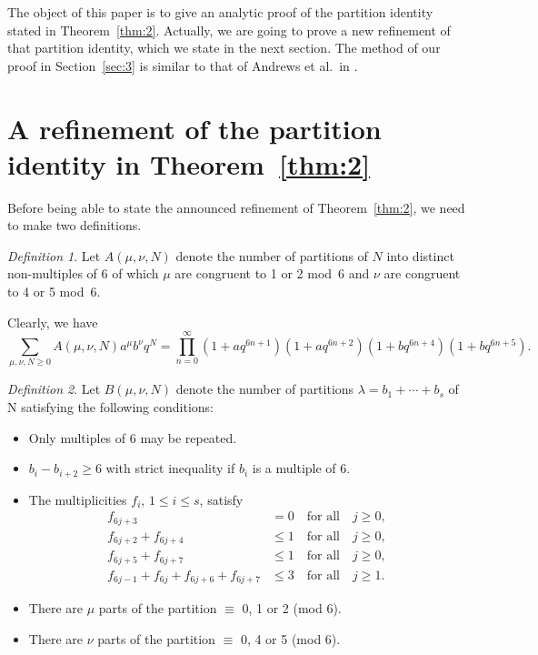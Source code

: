 \documentclass[12pt,twoside]{amsart}
\theoremstyle{remark}
\newtheorem{Definition}{Definition}
\numberwithin{equation}{section}
\begin{document}
     The object of this paper is to give an analytic proof of the
partition identity stated in
Theorem~\ref{thm:2}. Actually, we are going to prove a new refinement
of that partition identity, which we state in the next section.
The method of our proof in Section~\ref{sec:3}
is similar to that of Andrews et al.\ in \cite{R3}.

\section{A refinement of the partition identity in
Theorem~\ref{thm:2}} \label{sec:2}

Before being able to state the announced refinement of
Theorem~\ref{thm:2}, we need to make two definitions.

\begin{Definition}\label{def:1} Let $A(\mu,\nu,N)$ denote the number of
partitions of $N$ into distinct non-multiples of 6 of which $ \mu $
are congruent to 1 or 2 mod~6
and $\nu $  are congruent to 4 or 5 mod~6.
\end{Definition}

Clearly, we have
\begin{equation} \label{eq:GF}
\sum_{\mu,\nu,N \geq 0}A(\mu,\nu,N)a^\mu b^\nu q^N
 =
\prod^\infty_{n=0}(1+aq^{6n+1})(1+aq^{6n+2})(1+bq^{6n+4})(1+bq^{6n+5}).
\end{equation}

\begin{Definition}\label{def:2}
Let $B(\mu,\nu,N)$ denote the number of partitions
$ \lambda = b_1+\cdots+b_s $ of N satisfying the following conditions:

\begin{itemize}
\item [(i)]Only multiples of 6 may be repeated.
\item [(ii)]$ b_i-b_{i+2} \geq 6 $ with strict inequality if $b_i$ is
a multiple of 6.
\item [(iii)]The multiplicities $f_i$, $1\le i\le s$, satisfy
\begin{align*}
  f_{6j+3}&=0 \quad \text{for all}\quad  j \geq 0 ,\\
       f_{6j+2}+f_{6j+4} &\leq 1 \quad \text{for all}\quad j \geq 0 ,\\
       f_{6j+5}+f_{6j+7} &\leq 1 \quad \text{for all}\quad j \geq 0 ,\\
       f_{6j-1}+f_{6j}+f_{6j+6}+f_{6j+7} &\leq 3\quad \text{for all}\quad
j \geq 1 .
\end{align*}
\item [(iv)]There are $\mu$ parts of the partition $ \equiv $ 0, 1 or 2
(mod 6).
\item [(v)] There are $\nu$ parts of the partition $ \equiv $ 0, 4 or 5
(mod 6).
\end{itemize}
\end{Definition}
\end{document}
